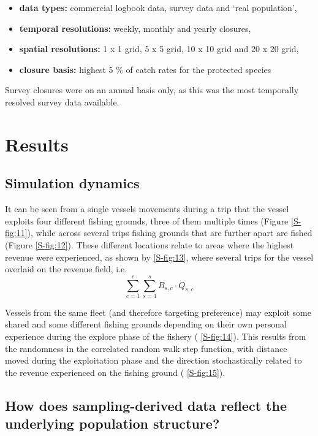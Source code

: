 \documentclass[review]{elsarticle}
\begin{document}
\begin{itemize}
	\item \textbf{data types:} commercial logbook data, survey data and
		`real population',
	\item \textbf{temporal resolutions:} weekly, monthly and yearly
		closures,
	\item \textbf{spatial resolutions:} 1 x 1 grid, 5 x 5 grid, 10 x 10
		grid and 20 x 20 grid,
	\item \textbf{closure basis:} highest 5 \%  of catch rates for the
		protected species
\end{itemize}

Survey closures were on an annual basis only, as this was the most temporally
resolved survey data available.

\section{Results}

\subsection{Simulation dynamics}

It can be seen from a single vessels movements during a trip that the vessel
exploits four different fishing grounds, three of them multiple times (Figure
\ref{S-fig:11}), while across several trips fishing grounds that are further
apart are fished (Figure \ref{S-fig:12}). These different locations relate to
areas where the highest revenue were experienced, as shown by
 \ref{S-fig:13}, where several trips for the vessel
overlaid on the revenue field, i.e. 
$$\sum^c_{c=1}\sum^s_{s=1} B_{s,c} \cdot Q_{s,c}$$

Vessels from the same fleet (and therefore targeting preference) may exploit
some shared and some different fishing grounds depending on their own personal
experience during the explore phase of the fishery (
\ref{S-fig:14}). This results from the randomness in the correlated random walk
step function, with distance moved during the exploitation phase and the
direction stochastically related to the revenue experienced on the fishing
ground (
\ref{S-fig:15}). 

\subsection{How does sampling-derived data reflect the underlying population
	structure?}
\end{document}
